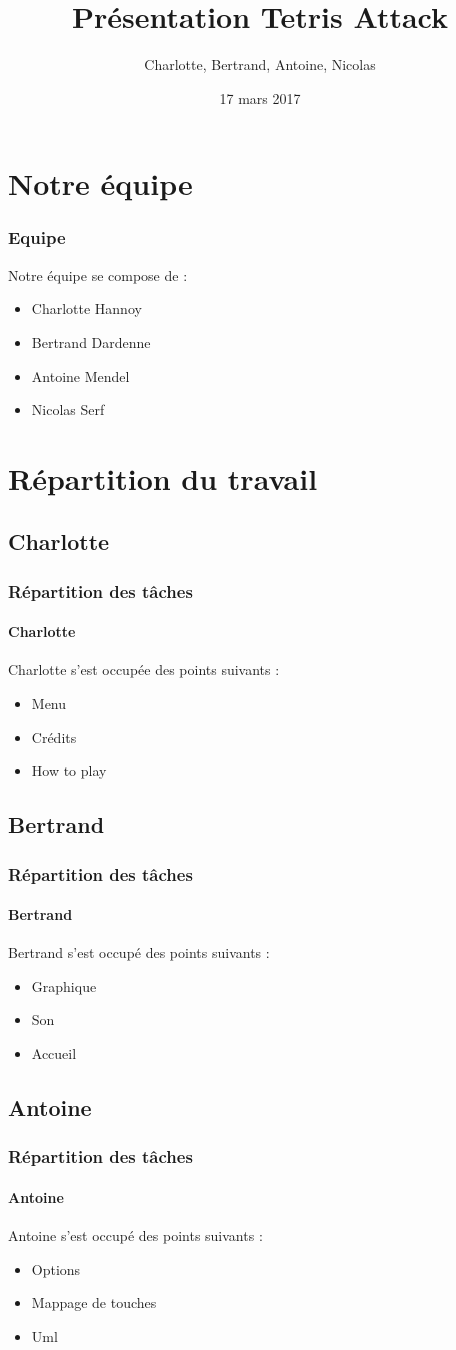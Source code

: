 \documentclass[handout]{beamer}
\title{Pr\'esentation Tetris Attack}
\author{Charlotte, Bertrand, Antoine, Nicolas}
\institute{Les bananes atomiques}
\date{17 mars 2017}
\begin{document}
\begin{frame}
\titlepage
\end{frame}

\section{Notre \'equipe}
\begin{frame}[label=Equipe]
\frametitle{Equipe}
Notre \'equipe se compose de : 
\begin{itemize}
\item Charlotte Hannoy
\item Bertrand Dardenne
\item Antoine Mendel
\item Nicolas Serf
\end{itemize}
\end{frame}

\section{R\'epartition du travail}
\subsection{Charlotte}
\begin{frame}[label=Charlotte]
\frametitle{R\'epartition des t\^{a}ches}
\framesubtitle{Charlotte}
Charlotte s'est occup\'ee des points suivants :
\begin{itemize}
\item Menu
\item Cr\'edits
\item How to play
\end{itemize}
\end{frame}

\subsection{Bertrand}
\begin{frame}[label=Bertrand]
\frametitle{R\'epartition des t\^{a}ches}
\framesubtitle{Bertrand}
Bertrand s'est occup\'e des points suivants :
\begin{itemize}
\item Graphique
\item Son
\item Accueil
\end{itemize}
\end{frame}

\subsection{Antoine}
\begin{frame}[label=Antoine]
\frametitle{R\'epartition des t\^{a}ches}
\framesubtitle{Antoine}
Antoine s'est occup\'e des points suivants :
\begin{itemize}
\item Options
\item Mappage de touches
\item Uml
\end{itemize}
\end{frame}
\end{document}
